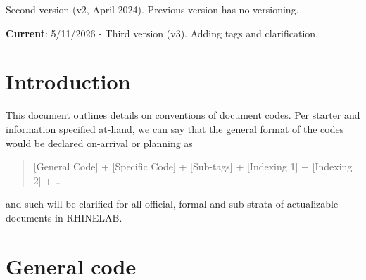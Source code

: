 \documentclass[9pt,a4paper]{article}
\begin{document}
Second version (v2, April 2024). Previous version has no versioning. 

\textbf{Current}: 5/11/2026 - Third version (v3). Adding tags and clarification. 

\section{Introduction}

This document outlines details on conventions of document codes. Per starter and information specified at-hand, we can say that the general format of the codes would be declared on-arrival or planning as
\begin{quote}
    [General Code] + [Specific Code] + [Sub-tags] + [Indexing 1] + [Indexing 2] + \dots
\end{quote}
and such will be clarified for all official, formal and sub-strata of actualizable documents in RHINELAB. 

\section{General code}
\end{document}
